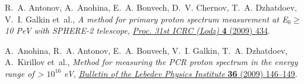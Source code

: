 \documentclass[a4paper,11pt]{article}
\begin{document}
\begin{thebibliography}{10}
R.~A. Antonov, A.~Anohina, E.~A. Bonvech, D.~V. Chernov, T.~A. Dzhatdoev, V.~I. Galkin et~al., \emph{A method for primary proton spectrum measurement at E$_0 \ge$ 10 PeV with SPHERE-2 telescope}, \href{https://galprop.stanford.edu/elibrary/icrc/2009/preliminary/pdf/icrc0434.pdf}{{\emph{{Proc. 31st ICRC (Lodz)}} {\bfseries 4} (2009) 434}}.

A.~Anohina, R.~A. Antonov, E.~A. Bonvech, V.~I. Galkin, T.~A. Dzhatdoev, A.~Kirillov et~al., \emph{Method for measuring the PCR proton spectrum in the energy range of > $10^{16}$ eV},
\href{http://dx.doi.org/10.3103/S1068335609050042}{\emph{Bulletin of the Lebedev Physics Institute} {\bfseries 36} (2009) 146--149}.




\end{thebibliography}


\end{document}
